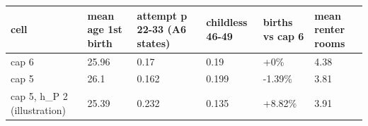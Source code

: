 \begingroup\small
\setlength{\tabcolsep}{3pt}
\renewcommand{\arraystretch}{1.04}
\begin{tabularx}{\linewidth}{XXXXXX}
\toprule
cell & mean age 1st birth & attempt p 22-33 (A6 states) & childless 46-49 & births vs cap 6 & mean renter rooms \\
\midrule
cap 6 & 25.96 & 0.17 & 0.19 & +0\% & 4.38 \\
cap 5 & 26.1 & 0.162 & 0.199 & -1.39\% & 3.81 \\
cap 5, h\_P 2 (illustration) & 25.39 & 0.232 & 0.135 & +8.82\% & 3.91 \\
\bottomrule
\end{tabularx}
\endgroup
